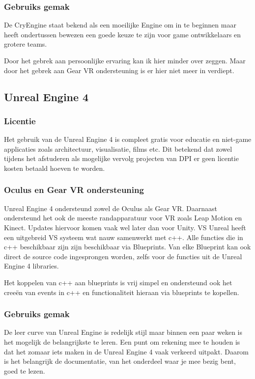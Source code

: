 \subsubsection{Gebruiks gemak}
De CryEngine staat bekend als een moeilijke Engine om in te beginnen maar heeft ondertussen bewezen een goede keuze te zijn voor game ontwikkelaars en grotere teams.

Door het gebrek aan persoonlijke ervaring kan ik hier minder over zeggen. Maar door het gebrek aan Gear VR ondersteuning is er hier niet meer in verdiept.

\subsection{Unreal Engine 4}
\subsubsection{Licentie}
Het gebruik van de Unreal Engine 4 is compleet gratis voor educatie en niet-game applicaties zoals architectuur, visualisatie, films etc. Dit betekend dat zowel tijdens het afstuderen als mogelijke vervolg projecten van DPI er geen licentie kosten betaald hoeven te worden.

\subsubsection{Oculus en Gear VR ondersteuning}
Unreal Engine 4 ondersteund zowel de Oculus als Gear VR. Daarnaast ondersteund het ook de meeste randapparatuur voor VR zoals Leap Motion en Kinect. Updates hiervoor komen vaak wel later dan voor Unity.
VS
Unreal heeft een uitgebreid VS systeem wat nauw samenwerkt met c++. Alle functies die in c++ beschikbaar zijn zijn beschikbaar via Blueprints. Van elke Blueprint kan ook direct de source code ingesprongen worden, zelfs voor de functies uit de Unreal Engine 4 libraries.

Het koppelen van c++ aan blueprints is vrij simpel en ondersteund ook het creeën van events in c++ en functionaliteit hieraan via blueprints te kopellen.

\subsubsection{Gebruiks gemak}
De leer curve van Unreal Engine is redelijk stijl maar binnen een paar weken is het mogelijk de belangrijkste te leren. Een punt om rekening mee te houden is dat het zomaar iets maken in de Unreal Engine 4 vaak verkeerd uitpakt. Daarom is het belangrijk de documentatie, van het onderdeel waar je mee bezig bent, goed te lezen.

